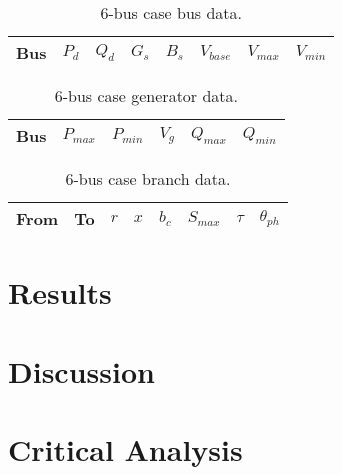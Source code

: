 \begin{table}
\begin{center}
\begin{tabular}{c|c|c|c|c|c|c|c}
\hline
Bus &$P_d$ &$Q_d$ &$G_s$ &$B_s$ &$V_{base}$ &$V_{max}$ &$V_{min}$\\
\hline\hline

\hline
\end{tabular}
\caption{6-bus case bus data.}
\label{tbl:case6ww_bus}
\end{center}
\end{table}

\begin{table}
\begin{center}
\begin{tabular}{c|c|c|c|c|c}
\hline
Bus &$P_{max}$ &$P_{min}$ &$V_g$ &$Q_{max}$ &$Q_{min}$\\
\hline\hline

\hline
\end{tabular}
\caption{6-bus case generator data.}
\label{tbl:case6ww_gen}
\end{center}
\end{table}

\begin{table}
\begin{center}
\begin{tabular}{c|c|c|c|c|c|c|c}
\hline
From &To &$r$ &$x$ &$b_c$ &$S_{max}$ &$\tau$ &$\theta_{ph}$\\
\hline\hline

\hline
\end{tabular}
\caption{6-bus case branch data.}
\label{tbl:case6ww_branch}
\end{center}
\end{table}


\section{Results}
\section{Discussion}
\section{Critical Analysis}


